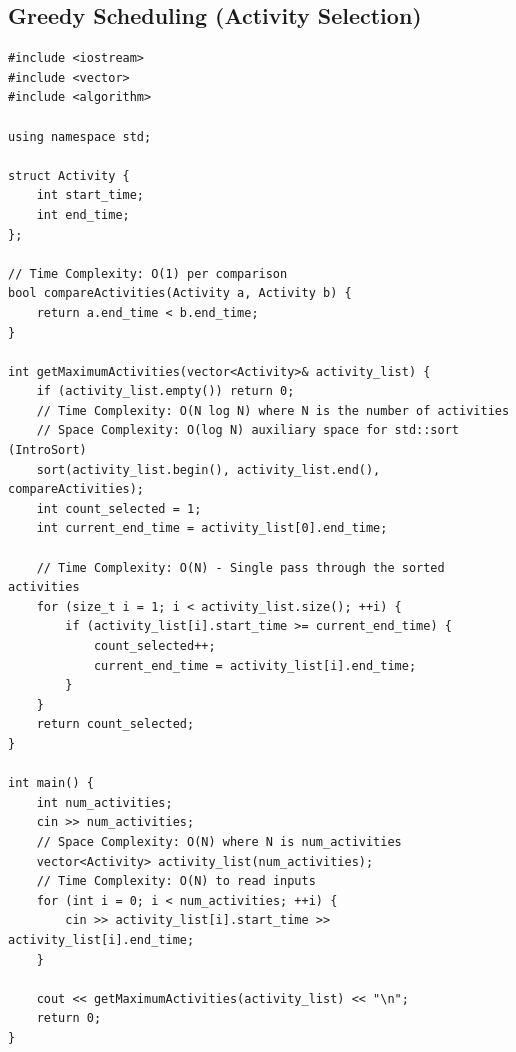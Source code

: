 \subsection{Greedy Scheduling (Activity Selection)}
\begin{lstlisting}
#include <iostream>
#include <vector>
#include <algorithm>

using namespace std;

struct Activity {
    int start_time;
    int end_time;
};

// Time Complexity: O(1) per comparison
bool compareActivities(Activity a, Activity b) {
    return a.end_time < b.end_time;
}

int getMaximumActivities(vector<Activity>& activity_list) {
    if (activity_list.empty()) return 0;
    // Time Complexity: O(N log N) where N is the number of activities
    // Space Complexity: O(log N) auxiliary space for std::sort (IntroSort)
    sort(activity_list.begin(), activity_list.end(), compareActivities);
    int count_selected = 1;
    int current_end_time = activity_list[0].end_time;
    
    // Time Complexity: O(N) - Single pass through the sorted activities
    for (size_t i = 1; i < activity_list.size(); ++i) {
        if (activity_list[i].start_time >= current_end_time) {
            count_selected++;
            current_end_time = activity_list[i].end_time;
        }
    }
    return count_selected;
}

int main() {
    int num_activities;
    cin >> num_activities;
    // Space Complexity: O(N) where N is num_activities
    vector<Activity> activity_list(num_activities);
    // Time Complexity: O(N) to read inputs
    for (int i = 0; i < num_activities; ++i) {
        cin >> activity_list[i].start_time >> activity_list[i].end_time;
    }
    
    cout << getMaximumActivities(activity_list) << "\n";
    return 0;
}
\end{lstlisting}

